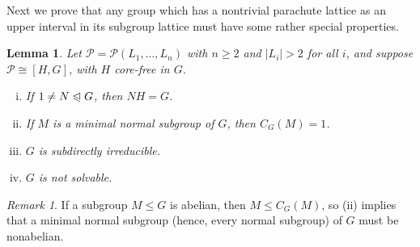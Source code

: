 \documentclass[cm,dissertation,actual,final]{uhthesis}
\theoremstyle{plain}
\newtheorem{lemma}[theorem]{Lemma}
\theoremstyle{definition}
\theoremstyle{remark}
\newtheorem*{remark}{Remark}
\numberwithin{theorem}{section}
\numberwithin{claim}{chapter}
\numberwithin{equation}{section}
\numberwithin{conjecture}{chapter}
\newcommand{\<}{\ensuremath{\langle}}
\renewcommand{\>}{\ensuremath{\rangle}}
\renewcommand{\leq}{\ensuremath{\leqslant}}
\renewcommand{\geq}{\ensuremath{\geqslant}}
\newcommand{\subnormal}{\ensuremath{\trianglelefteqslant}}
\newcommand{\0}{\ensuremath{\mathbf{0}}}
\newcommand{\1}{\ensuremath{\mathbf{1}}}
\newcommand{\2}{\ensuremath{\mathbf{2}}}
\newcommand{\3}{\ensuremath{\mathbf{3}}}
\newcommand{\4}{\ensuremath{\mathbf{4}}}
\newcommand{\5}{\ensuremath{\mathbf{5}}}
\newcommand{\sP}{\ensuremath{\mathscr{P}}}
\begin{document}
Next we prove that %
any group which has a nontrivial parachute lattice as an upper interval
in its subgroup lattice must have some rather special properties.  
\begin{lemma}
\label{lemma-wjd-5}
 Let $\sP = \sP(L_1, \dots, L_n)$ with $n\geq 2$ and $|L_i|>2$ for all
$i$, and suppose $\sP \cong [H, G]$, with $H$ core-free in $G$.  
\begin{enumerate}[(i)]
\item If $1\neq N \subnormal G$, then $NH = G$.
\item If $M$ is a minimal normal subgroup of $G$, then $C_G(M)=1$.
\item $G$ is subdirectly irreducible.
\item $G$ is not solvable.
\end{enumerate}
\end{lemma}
\begin{remark}
If a subgroup $M\leq G$ is abelian, then $M \leq C_G(M)$, so (ii) implies
that a minimal normal subgroup (hence, every normal subgroup) of $G$ must be
nonabelian.  
\end{remark}
\end{document}
